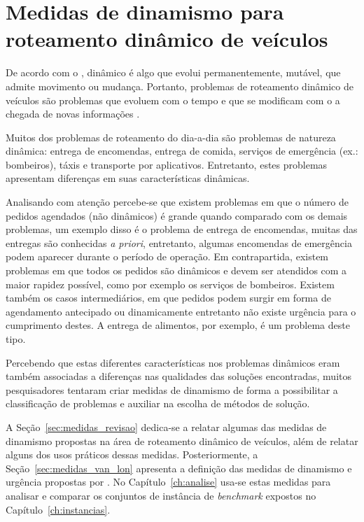 \chapter{Medidas de dinamismo para roteamento dinâmico de veículos}
\label{ch:medidas}



De acordo com o \textcite{michaelis_dinamico_2019}, dinâmico é algo que evolui
permanentemente, mutável, que admite movimento ou mudança.
Portanto, problemas de roteamento dinâmico de veículos são problemas que 
evoluem com o tempo e que se modificam com o a chegada de novas informações 
\cite{psaraftis_dynamic_2015}.

Muitos dos problemas de roteamento do dia-a-dia são problemas de natureza
dinâmica: entrega de encomendas, entrega de comida, serviços de emergência
(ex.: bombeiros), táxis e transporte por aplicativos. 
Entretanto, estes problemas apresentam diferenças em suas características 
dinâmicas. 

Analisando com atenção percebe-se que existem problemas em que o número de
pedidos agendados (não dinâmicos) é grande quando comparado com os demais
problemas, um exemplo disso é o problema de entrega de encomendas, muitas das
entregas são conhecidas \textit{a priori}, entretanto, algumas encomendas de
emergência podem aparecer durante o período de operação.
Em contrapartida, existem problemas em que todos os pedidos são dinâmicos e
devem ser atendidos com a maior rapidez possível, como por exemplo os serviços
de bombeiros.
Existem também os casos intermediários, em que pedidos podem surgir em forma de
agendamento antecipado ou dinamicamente entretanto não existe urgência para o
cumprimento destes.
A entrega de alimentos, por exemplo, é um problema deste tipo.

Percebendo que estas diferentes características nos problemas dinâmicos eram 
também associadas a diferenças nas qualidades das soluções encontradas,
muitos pesquisadores tentaram criar medidas de dinamismo de forma a 
possibilitar a classificação de problemas e auxiliar na escolha de métodos de 
solução.

A Seção~\ref{sec:medidas_revisao} dedica-se a relatar algumas das medidas de
dinamismo propostas na área de roteamento dinâmico de veículos,
além de relatar alguns dos usos práticos dessas medidas. 
Posteriormente, a Seção~\ref{sec:medidas_van_lon} apresenta a definição das
medidas de dinamismo e urgência propostas por \textcite{van_lon_measures_2016}.
No Capítulo~\ref{ch:analise} usa-se estas medidas para analisar
e comparar os conjuntos de instância de \textit{benchmark} expostos no 
Capítulo~\ref{ch:instancias}.








